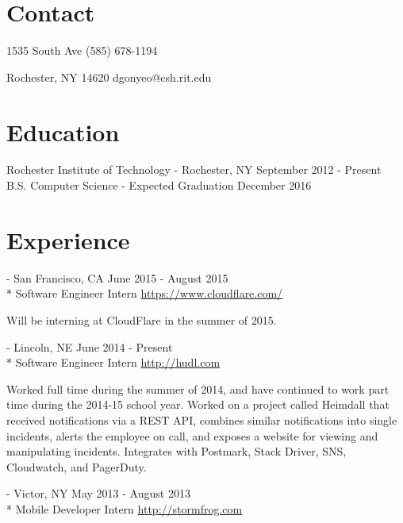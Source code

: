 \documentclass[letterpaper,margin,line,11pt]{resume}
\newcommand{\rurl}[1]{\hfill {\footnotesize \url{#1}}}
\newcommand{\rdate}[1]{\hfill {\small #1}}
\renewcommand{\employer}[5]{\item[#1] - #2 \rdate{#3} \\* #4 \rurl{#5}}
\begin{document}
\begin{resume}
\section{\mysidestyle Contact} 
    \begin{asparablank}
        \item 1535 South Ave \hfill (585) 678-1194
        \item Rochester, NY 14620 \hfill dgonyeo@csh.rit.edu
    \end{asparablank}

\section{\mysidestyle Education}
    \begin{compactdesc}
        \item[Rochester Institute of Technology] - Rochester, NY \rdate{September 2012 - Present}
        \small
        \\B.S. Computer Science  - Expected Graduation December 2016
    \end{compactdesc}

\section{\mysidestyle Experience}
    \begin{asparadesc}
        \employer{CloudFlare}{San Francisco, CA} {June 2015 - August 2015}{Software Engineer Intern}{https://www.cloudflare.com/}

        \small
        Will be interning at CloudFlare in the summer of 2015.
        \normalsize
        \\

        \employer{Hudl}{Lincoln, NE}{June 2014 - Present}{Software Engineer Intern}{http://hudl.com}

        \small
        Worked full time during the summer of 2014, and have continued to work part time during the 2014-15 school year. Worked on a project called Heimdall that received notifications via a REST API, combines similar notifications into single incidents, alerts the employee on call, and exposes a website for viewing and manipulating incidents. Integrates with Postmark, Stack Driver, SNS, Cloudwatch, and PagerDuty.
        \normalsize
        \\
        \employer{Stormfrog}{Victor, NY}{May 2013 - August 2013}{Mobile Developer Intern}{http://stormfrog.com}


\end{asparadesc}
\end{resume}
\end{document}
